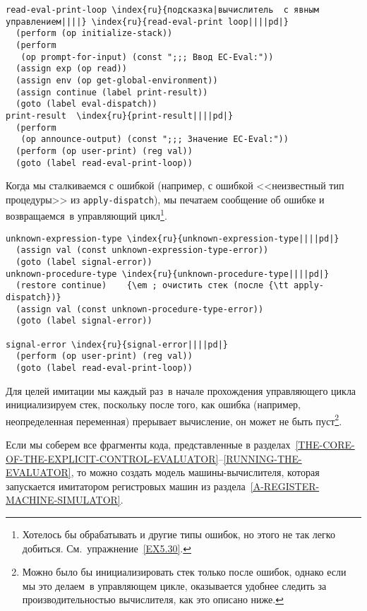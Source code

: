 \begin{Verbatim}[fontsize=\small]
read-eval-print-loop \index{ru}{подсказка|вычислитель  с явным управлением||||} \index{ru}{read-eval-print loop||||pd|}
  (perform (op initialize-stack))
  (perform
   (op prompt-for-input) (const ";;; Ввод EC-Eval:"))
  (assign exp (op read))
  (assign env (op get-global-environment))
  (assign continue (label print-result))
  (goto (label eval-dispatch))
print-result  \index{ru}{print-result||||pd|}
  (perform
   (op announce-output) (const ";;; Значение EC-Eval:"))
  (perform (op user-print) (reg val))
  (goto (label read-eval-print-loop))
\end{Verbatim}

Когда мы сталкиваемся с ошибкой (например, с ошибкой
<<неизвестный тип процедуры>> из {\tt apply-dispatch}), мы
печатаем сообщение об ошибке и возвращаемся~в управляющий
цикл\footnote{Хотелось бы обрабатывать и другие типы ошибок, но
этого не так легко добиться. См.~упражнение~\ref{EX5.30}.
}.

\begin{Verbatim}[fontsize=\small]
unknown-expression-type \index{ru}{unknown-expression-type||||pd|}
  (assign val (const unknown-expression-type-error))
  (goto (label signal-error))
unknown-procedure-type \index{ru}{unknown-procedure-type||||pd|}
  (restore continue)    {\em ; очистить стек (после {\tt apply-dispatch})}
  (assign val (const unknown-procedure-type-error))
  (goto (label signal-error))

signal-error \index{ru}{signal-error||||pd|}
  (perform (op user-print) (reg val))
  (goto (label read-eval-print-loop))
\end{Verbatim}

Для целей имитации мы каждый раз~в начале прохождения
управляющего цикла инициализируем стек, поскольку после того, как
ошибка (например, неопределенная переменная) прерывает вычисление, он
может не быть пуст\footnote{Можно было бы инициализировать стек только после
ошибок, однако если мы это делаем~в управляющем цикле, оказывается
удобнее следить за производительностью вычислителя, как это описано
ниже.
}.

Если мы соберем все фрагменты кода, представленные в
разделах~\ref{THE-CORE-OF-THE-EXPLICIT-CONTROL-EVALUATOR}--\ref{RUNNING-THE-EVALUATOR},
то можно создать модель машины-вычислителя, которая запускается
имитатором регистровых машин из раздела~\ref{A-REGISTER-MACHINE-SIMULATOR}.

